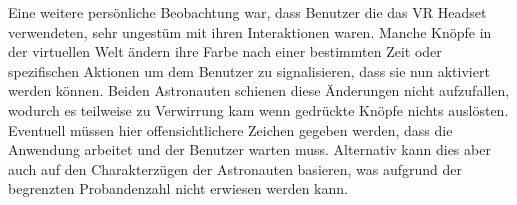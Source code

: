 Eine weitere persönliche Beobachtung war, dass Benutzer die das VR Headset verwendeten, sehr ungestüm mit ihren Interaktionen waren. Manche Knöpfe in der virtuellen Welt ändern ihre Farbe nach einer bestimmten Zeit oder spezifischen Aktionen um dem Benutzer zu signalisieren, dass sie nun aktiviert werden können. Beiden Astronauten schienen diese Änderungen nicht aufzufallen, wodurch es teilweise zu Verwirrung kam wenn gedrückte Knöpfe nichts auslösten. Eventuell müssen hier offensichtlichere Zeichen gegeben werden, dass die Anwendung arbeitet und der Benutzer warten muss. Alternativ kann dies aber auch auf den Charakterzügen der Astronauten basieren, was aufgrund der begrenzten Probandenzahl nicht erwiesen werden kann.